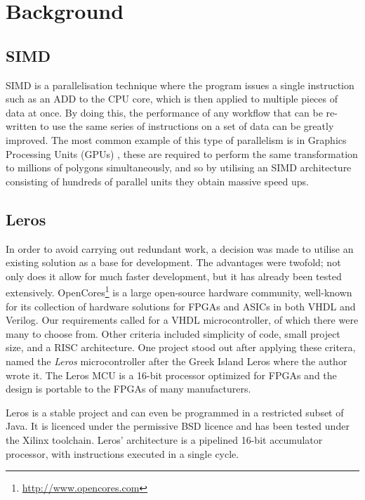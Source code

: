 \section{Background}
\subsection{SIMD}

SIMD is a parallelisation
technique where the program issues a single instruction such as an ADD to the
CPU core, which is then applied to multiple pieces of data at once.  By doing
this, the performance of any workflow that can be re-written to use the same series of instructions
on a set of data can be greatly improved.  The most common example of this type of
parallelism is in Graphics Processing Units (GPUs)
\cite{Fatahalian:2008:CLG:1400181.1400197}, these are required to perform the
same transformation to millions of polygons simultaneously, and so by utilising
an SIMD architecture consisting of hundreds of parallel units they
obtain massive speed ups.

\subsection{Leros}
In order to avoid carrying out redundant work, a decision was made to utilise an
existing solution as a base for development. The advantages were twofold; not only
does it allow for much faster development, but it has already been tested extensively.
OpenCores\footnote{\url{http://www.opencores.com}}
is a large open-source hardware community, well-known for its collection of hardware solutions for
FPGAs and ASICs in both VHDL and Verilog. Our requirements called for a VHDL
microcontroller, of which there were many to choose from. Other criteria included
simplicity of code, small project size, and a RISC architecture. One project stood out
after applying these critera, named the \emph{Leros} microcontroller after the
Greek Island Leros \cite{schoeberlleros} where the author wrote it.  The Leros MCU is a 16-bit
processor optimized for FPGAs \cite{schoeberlleros} and the design is portable
to the FPGAs of many manufacturers.

Leros is a stable
project and can even be programmed in a restricted subset of Java. It is licenced
under the permissive BSD licence and has been tested under the Xilinx toolchain.
Leros' architecture is a pipelined 16-bit accumulator processor\cite{schoeberlleros},
with instructions executed in a single cycle.

